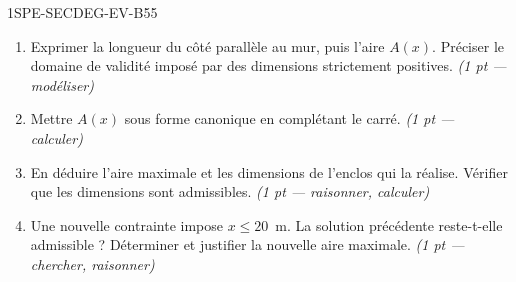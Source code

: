\begin{evaluation}{1SPE-SECDEG-EV-B}{55}
\begin{enumerate}
  \item Exprimer la longueur du côté parallèle au mur, puis l'aire $A(x)$.
  Préciser le domaine de validité imposé par des dimensions strictement positives.
  \hfill\textit{(1 pt — modéliser)}

  \item Mettre $A(x)$ sous forme canonique en complétant le carré.
  \hfill\textit{(1 pt — calculer)}

  \item En déduire l'aire maximale et les dimensions de l'enclos qui la réalise.
  Vérifier que les dimensions sont admissibles.
  \hfill\textit{(1 pt — raisonner, calculer)}

  \item Une nouvelle contrainte impose $x\leq20$~m. La solution précédente
  reste-t-elle admissible ? Déterminer et justifier la nouvelle aire maximale.
  \hfill\textit{(1 pt — chercher, raisonner)}
\end{enumerate}

\end{evaluation}
